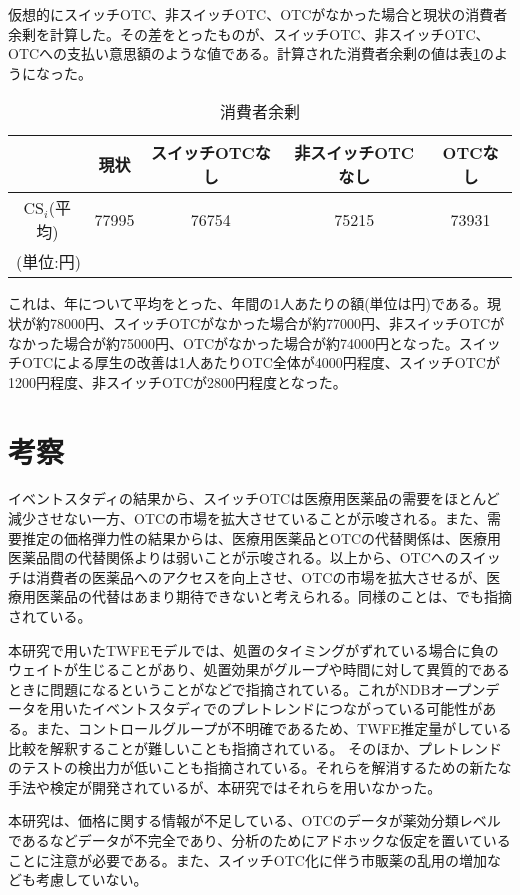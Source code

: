 \documentclass[a4paper,11pt,uplatex]{jsarticle}
\theoremstyle{definition}
\begin{document}
仮想的にスイッチOTC、非スイッチOTC、OTCがなかった場合と現状の消費者余剰を計算した。その差をとったものが、スイッチOTC、非スイッチOTC、OTCへの支払い意思額のような値である。計算された消費者余剰の値は表\ref{consumer_surplus}のようになった。
\begin{table}[H]\centering \caption{消費者余剰}\label{consumer_surplus}
    \begin{tabular}{ccccc}
        \hline
        &現状 & スイッチOTCなし & 非スイッチOTCなし & OTCなし \\
        \hline
        \(\textrm{CS}_i\)(平均)&77995 & 76754 & 75215 & 73931\\
        \hline
        \multicolumn{5}{l}{\small (単位:円)}
    \end{tabular}
\end{table}
これは、年について平均をとった、年間の1人あたりの額(単位は円)である。現状が約78000円、スイッチOTCがなかった場合が約77000円、非スイッチOTCがなかった場合が約75000円、OTCがなかった場合が約74000円となった。スイッチOTCによる厚生の改善は1人あたりOTC全体が4000円程度、スイッチOTCが1200円程度、非スイッチOTCが2800円程度となった。
\section{考察}
イベントスタディの結果から、スイッチOTCは医療用医薬品の需要をほとんど減少させない一方、OTCの市場を拡大させていることが示唆される。また、需要推定の価格弾力性の結果からは、医療用医薬品とOTCの代替関係は、医療用医薬品間の代替関係よりは弱いことが示唆される。以上から、OTCへのスイッチは消費者の医薬品へのアクセスを向上させ、OTCの市場を拡大させるが、医療用医薬品の代替はあまり期待できないと考えられる。同様のことは、\cite{Stomberg2013}でも指摘されている。

本研究で用いたTWFEモデルでは、処置のタイミングがずれている場合に負のウェイトが生じることがあり、処置効果がグループや時間に対して異質的であるときに問題になるということが\cite{ROTH2023}などで指摘されている。これがNDBオープンデータを用いたイベントスタディでのプレトレンドにつながっている可能性がある。また、コントロールグループが不明確であるため、TWFE推定量がしている比較を解釈することが難しいことも指摘されている。
そのほか、プレトレンドのテストの検出力が低いことも指摘されている。それらを解消するための新たな手法や検定が開発されているが、本研究ではそれらを用いなかった。

本研究は、価格に関する情報が不足している、OTCのデータが薬効分類レベルであるなどデータが不完全であり、分析のためにアドホックな仮定を置いていることに注意が必要である。また、スイッチOTC化に伴う市販薬の乱用の増加なども考慮していない。
\end{document}
